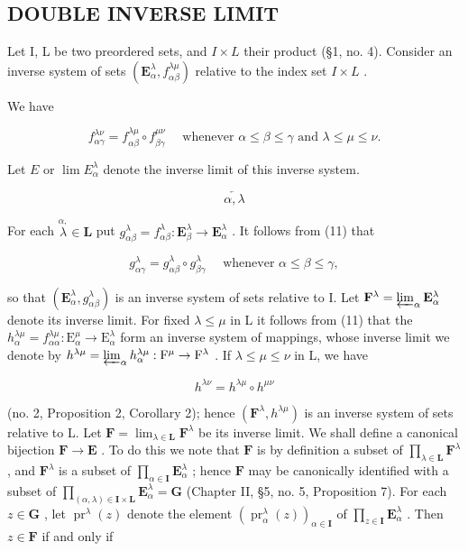 \subsection{DOUBLE INVERSE LIMIT}

Let I, L be two preordered sets, and \(I \times L\) their product (§1, no. 4). Consider an inverse system of sets \((\mathbf{E}_{\alpha}^{\lambda}, f_{\alpha\beta}^{\lambda\mu})\) relative to the index set \(I \times L\) .

We have

\[
f _ {\alpha \gamma} ^ {\lambda \nu} = f _ {\alpha \beta} ^ {\lambda \mu} \circ f _ {\beta \gamma} ^ {\mu \nu} \quad \text { whenever } \alpha \leqslant \beta \leqslant \gamma \text { and } \lambda \leqslant \mu \leqslant \nu . \tag {11}
\]

Let \(E\) or \(\lim E_{\alpha}^{\lambda}\) denote the inverse limit of this inverse system.

\[
\overleftarrow {\alpha , \lambda}
\]

For each \(\stackrel{\alpha,}{\lambda} \in \mathbf{L}\) put \(g_{\alpha \beta}^{\lambda} = f_{\alpha \beta}^{\lambda}: \mathbf{E}_{\beta}^{\lambda} \to \mathbf{E}_{\alpha}^{\lambda}\) . It follows from (11) that

\[
g _ {\alpha \gamma} ^ {\lambda} = g _ {\alpha \beta} ^ {\lambda} \circ g _ {\beta \gamma} ^ {\lambda} \quad \text { whenever } \alpha \leqslant \beta \leqslant \gamma ,\tag{12}
\]

so that \((\mathbf{E}_{\alpha}^{\lambda}, g_{\alpha \beta}^{\lambda})\) is an inverse system of sets relative to I. Let \(\mathbf{F}^{\lambda} = \varprojlim_{\alpha} \mathbf{E}_{\alpha}^{\lambda}\) denote its inverse limit. For fixed \(\lambda \leqslant \mu\) in L it follows from (11) that the \(h_{\alpha}^{\lambda \mu} = f_{\alpha \alpha}^{\lambda \mu}: \mathrm{E}_{\alpha}^{\mu} \to \mathrm{E}_{\alpha}^{\lambda}\) form an inverse system of mappings, whose inverse limit we denote by \(h^{\lambda \mu} = \varprojlim_{\alpha} h_{\alpha}^{\lambda \mu}: \mathrm{F}^{\mu} \to \mathrm{F}^{\lambda}\) . If \(\lambda \leqslant \mu \leqslant \nu\) in L, we have

\[
h ^ {\lambda \nu} = h ^ {\lambda \mu} \circ h ^ {\mu \nu}\tag{13}
\]

(no. 2, Proposition 2, Corollary 2); hence \((\mathbf{F}^{\lambda}, h^{\lambda \mu})\) is an inverse system of sets relative to L. Let \(\mathbf{F} = \lim_{\lambda \in \mathbf{L}} \mathbf{F}^{\lambda}\) be its inverse limit. We shall define a canonical bijection \(\mathbf{F} \to \mathbf{E}\) . To do this we note that \(\mathbf{F}\) is by definition a subset of \(\prod_{\lambda \in \mathbf{L}} \mathbf{F}^{\lambda}\) , and \(\mathbf{F}^{\lambda}\) is a subset of \(\prod_{\alpha \in \mathbf{I}} \mathbf{E}_{\alpha}^{\lambda}\) ; hence \(\mathbf{F}\) may be canonically identified with a subset of \(\prod_{(\alpha, \lambda) \in \mathbf{I} \times \mathbf{L}} \mathbf{E}_{\alpha}^{\lambda} = \mathbf{G}\) (Chapter II, §5, no. 5, Proposition 7). For each \(z \in \mathbf{G}\) , let \(\operatorname{pr}^{\lambda}(z)\) denote the element \((\operatorname{pr}_{\alpha}^{\lambda}(z))_{\alpha \in \mathbf{I}}\) of \(\prod_{z \in \mathbf{I}} \mathbf{E}_{\alpha}^{\lambda}\) . Then \(z \in \mathbf{F}\) if and only if

